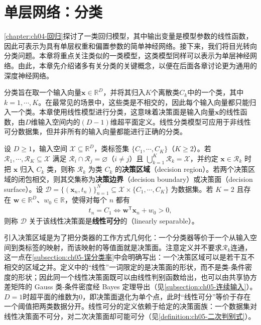 \documentclass[../main.tex]{subfiles}
\begin{document}
\chapter{单层网络：分类}\label{chapter:ch05-分类}

\cref{chapter:ch04-回归}探讨了一类回归模型，其中输出变量是模型参数的线性函数，因此可表示为具有单层权重和偏置参数的简单神经网络。接下来，我们将目光转向分类问题。本章将重点关注类似的一类模型，这类模型同样可以表示为单层神经网络。由此，本章先介绍诸多有关分类的关键概念，以便在后面各章讨论更为通用的深度神经网络。

分类旨在取一个输入向量$\boldsymbol{x}\in\mathbb{R}^{D}$，并将其归入$K$个离散类$C_k$中的一个类，其中$k=1,\cdots,K$。在最常见的场景中，这些类是不相交的，因此每个输入向量都只能归入一个类。本章使用线性模型进行分类，这意味着决策面是输入向量$\boldsymbol{x}$的线性函数，由$D$维输入空间内的$(D-1)$维超平面定义。线性分类模型可应用于非线性可分数据集，但并非所有的输入向量都能进行正确的分类。

\begin{definition}\label{definition:ch05-决策区域}
设 $D\geqslant1$，输入空间 $\mathcal{X}\subseteq\mathbb{R}^{D}$，类标签集 $\{C_1,\cdots,C_K\}$（$K\geqslant2$）。若 $\mathcal{R}_1,\cdots,\mathcal{R}_K\subseteq\mathcal{X}$ 满足 $\mathcal{R}_i\cap\mathcal{R}_j=\varnothing$（$i\neq j$）且 $\bigcup_{k=1}^{K}\mathcal{R}_k=\mathcal{X}$，并约定 $\boldsymbol{x}\in\mathcal{R}_k$ 时把 $\boldsymbol{x}$ 归入 $C_k$ 类，则称 $\mathcal{R}_k$ 为类 $C_k$ 的\textbf{决策区域}（decision region）。若两个决策区域的闭包相交，则其交集称为\textbf{决策边界}（decision boundary）或决策面（decision surface）。设 $\mathcal{D}=\{(\boldsymbol{x}_n,t_n)\}_{n=1}^{N}\subseteq\mathcal{X}\times\{C_1,\cdots,C_K\}$ 为数据集。若 $K=2$ 且存在 $\boldsymbol{w}\in\mathbb{R}^{D}$、$w_0\in\mathbb{R}$，使得对每个 $n$ 都有
\begin{align*}
  t_n=C_1\iff \boldsymbol{w}^{\mathsf{T}}\boldsymbol{x}_n+w_0>0,
\end{align*}
则称 $\mathcal{D}$ 关于该线性决策面是\textbf{线性可分}的（linearly separable）。
\end{definition}

\begin{remark}
引入决策区域是为了把分类器的工作方式几何化：一个分类器等价于一个从输入空间到类标签的映射，而该映射的等值面就是决策面。注意定义并不要求$\mathcal{R}_k$连通，这一点在\cref{subsection:ch05-误分类率}中会明确写出：一个决策区域可以是若干互不相交的区域之并。定义中的“线性”一词限定的是决策面的形状，而不是类-条件密度的形状；因此同一个线性决策面既可以由线性判别函数给出，也可以由共享协方差矩阵的 Gauss 类-条件密度经 Bayes 定理导出（见\cref{subsection:ch05-连续输入}）。$D=1$时超平面的维数为$0$，即决策面退化为单个点，此时“线性可分”等价于存在一个阈值把两类数据分开。线性可分的定义依赖于给定的决策面族：一个数据集对线性决策面不可分，对二次决策面却可能可分（见\cref{definition:ch05-二次判别式}）。
\end{remark}
\end{document}
